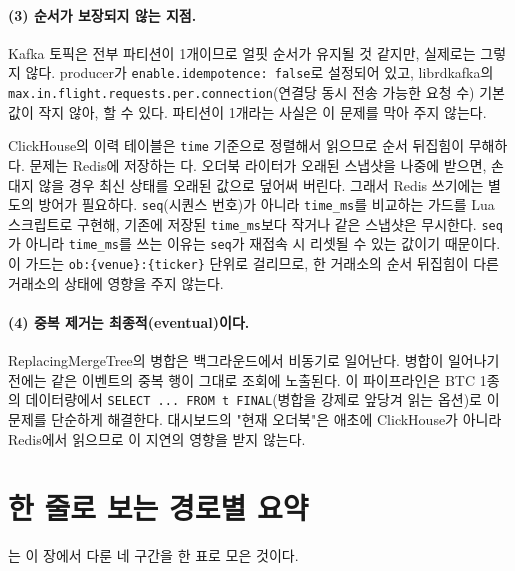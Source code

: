 \paragraph{(3) 순서가 보장되지 않는 지점.} Kafka 토픽은 전부 파티션이 1개이므로
얼핏 순서가 유지될 것 같지만, 실제로는 그렇지 않다. producer가
\texttt{enable.idempotence: false}로 설정되어 있고, librdkafka의
\texttt{max.in.flight.requests.per.connection}(연결당 동시 전송 가능한 요청 수)
기본값이 작지 않아, 할 수 있다. 파티션이
1개라는 사실은 이 문제를 막아 주지 않는다.

ClickHouse의 이력 테이블은 \texttt{time} 기준으로 정렬해서 읽으므로 순서 뒤집힘이
무해하다. 문제는 Redis에 저장하는 다. 오더북 라이터가 오래된
스냅샷을 나중에 받으면, 손대지 않을 경우 최신 상태를 오래된 값으로 덮어써 버린다.
그래서 Redis 쓰기에는 별도의 방어가 필요하다. \texttt{seq}(시퀀스 번호)가 아니라
\texttt{time\_ms}를 비교하는  가드를
Lua 스크립트로 구현해, 기존에 저장된 \texttt{time\_ms}보다 작거나 같은 스냅샷은
무시한다. \texttt{seq}가 아니라 \texttt{time\_ms}를 쓰는 이유는 \texttt{seq}가
재접속 시 리셋될 수 있는 값이기 때문이다. 이 가드는 \texttt{ob:\{venue\}:\{ticker\}}
단위로 걸리므로, 한 거래소의 순서 뒤집힘이 다른 거래소의 상태에 영향을 주지 않는다.

\paragraph{(4) 중복 제거는 최종적(eventual)이다.} ReplacingMergeTree의 병합은
백그라운드에서 비동기로 일어난다. 병합이 일어나기 전에는 같은 이벤트의 중복 행이
그대로 조회에 노출된다. 이 파이프라인은 BTC 1종의 데이터량에서 \texttt{SELECT ...
FROM t FINAL}(병합을 강제로 앞당겨 읽는 옵션)로 이 문제를 단순하게 해결한다. 대시보드의
"현재 오더북"은 애초에 ClickHouse가 아니라 Redis에서 읽으므로 이 지연의 영향을
받지 않는다.

\section{한 줄로 보는 경로별 요약}
\label{sec:delivery-summary}

는 이 장에서 다룬 네 구간을 한 표로 모은 것이다.


